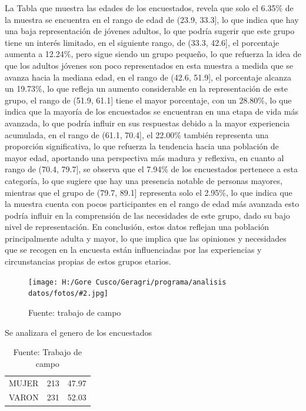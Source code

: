 \documentclass{article}\usepackage[]{graphicx}\usepackage[table]{xcolor}
\newenvironment{fotos}[2]
{\begin{figure}[H]
	\centering
	\caption{#1}
	\texttt{[image: H:/Gore Cusco/Geragri/programa/analisis datos/fotos/\#2.jpg]}
	\caption*{Fuente: trabajo de campo}}
{\end{figure}}
\begin{document}
La Tabla que muestra las edades de los encuestados, revela que solo el 6.35\% de la muestra se encuentra en el rango de edad de (23.9, 33.3], lo que indica que hay una baja representación de jóvenes adultos, lo que podría sugerir que este grupo tiene un interés limitado, en el siguiente rango, de (33.3, 42.6], el porcentaje aumenta a 12.24\%, pero sigue siendo un grupo pequeño, lo que refuerza la idea de que los adultos jóvenes son poco representados en esta muestra a medida que se avanza hacia la mediana edad, en el rango de (42.6, 51.9], el porcentaje alcanza un 19.73\%, lo que refleja un aumento considerable en la representación de este grupo, el rango de (51.9, 61.1] tiene el mayor porcentaje, con un 28.80\%, lo que indica que la mayoría de los encuestados se encuentran en una etapa de vida más avanzada, lo que podría influir en sus respuestas debido a la mayor experiencia acumulada, en el rango de (61.1, 70.4], el 22.00\% también representa una proporción significativa, lo que refuerza la tendencia hacia una población de mayor edad, aportando una perspectiva más madura y reflexiva, en cuanto al rango de (70.4, 79.7], se observa que el 7.94\% de los encuestados pertenece a esta categoría, lo que sugiere que hay una presencia notable de personas mayores, mientras que el grupo de (79.7, 89.1] representa solo el 2.95\%, lo que indica que la muestra cuenta con pocos participantes en el rango de edad más avanzada esto podría influir en la comprensión de las necesidades de este grupo, dado su bajo nivel de representación. En conclusión, estos datos reflejan una población principalmente adulta y mayor, lo que implica que las opiniones y necesidades que se recogen en la encuesta están influenciadas por las experiencias y circunstancias propias de estos grupos etarios.

\begin{fotos}
{Aplicacion de encuestas}{1}
\end{fotos}


Se analizara el genero de los encuestados
\begin{table}[H]
  \centering
  \caption{Genero de los encuestados}

\begin{tabular}{lcl}
\toprule
\cellcolor[HTML]{87A96B}{\textcolor{black}{\textbf{GENERO}}} & \cellcolor[HTML]{87A96B}{\textcolor{black}{\textbf{Conteo}}} & \cellcolor[HTML]{87A96B}{\textcolor{black}{\textbf{Porcentaje}}}\\
\midrule
MUJER & 213 & 47.97\\
VARON & 231 & 52.03\\
\bottomrule
\end{tabular}

  \caption*{Fuente: Trabajo de campo}
\end{table}  
\end{document}
